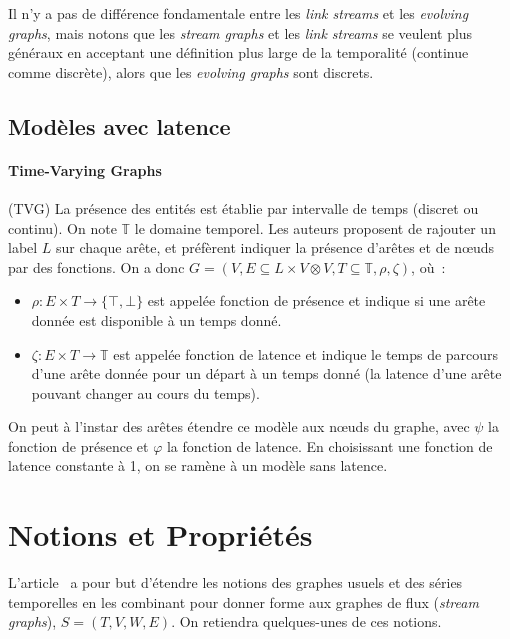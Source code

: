 \documentclass[12pt,a4paper]{article}
\begin{document}
Il n'y a pas de différence fondamentale entre les \textit{link
  streams} et les \textit{evolving graphs}, mais notons que les
\textit{stream graphs} et les \textit{link streams} se veulent plus
généraux en acceptant une définition plus large de la temporalité
(continue comme discrète), alors que les \textit{evolving graphs} sont
discrets.

\subsection{Modèles avec latence}

\paragraph{Time-Varying Graphs}\cite{casteigts2012time} (TVG) La présence
des entités est établie par intervalle de temps (discret ou
continu). On note \(\mathbb{T}\) le domaine temporel. Les auteurs
proposent de rajouter un label \(L\) sur chaque arête, et préfèrent
indiquer la présence d'arêtes et de nœuds par des fonctions. On a donc
\(G = (V, E \subseteq L \times V \otimes V, T \subseteq \mathbb{T},
\rho, \zeta)\), où~:
\begin{itemize}
\item \(\rho : E \times T \to \{\top, \bot\}\) est appelée fonction
  de présence et indique si une arête donnée est disponible à un temps
  donné.
\item \(\zeta : E \times T \to \mathbb{T}\) est appelée fonction de
  latence et indique le temps de parcours d'une arête donnée pour un
  départ à un temps donné (la latence d'une arête pouvant changer au
  cours du temps).
\end{itemize}

On peut à l'instar des arêtes étendre ce modèle aux nœuds du graphe,
avec \(\psi\) la fonction de présence et \(\varphi\) la fonction de
latence. En choisissant une fonction de latence constante à 1, on se
ramène à un modèle sans latence.

\section{Notions et Propriétés}

L'article~\cite{latapy2017stream} a pour but d'étendre les notions des
graphes usuels et des séries temporelles en les combinant pour donner
forme aux graphes de flux (\textit{stream graphs}),
\(S = (T, V, W, E)\). On retiendra quelques-unes de ces notions.
\end{document}
